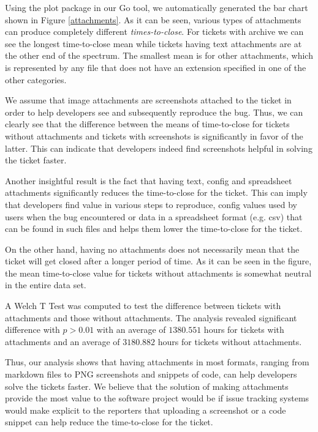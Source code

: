 \documentclass{mpaper}
\begin{document}
Using the plot package in our Go tool, we automatically generated the bar chart shown in Figure \ref{attachments}. 
As it can be seen, various types of attachments can produce completely different \emph{times-to-close}. For 
tickets with archive we can see the longest time-to-close mean while tickets having text attachments are at 
the other end of the spectrum. The smallest mean is for other attachments, which is represented by any file 
that does not have an extension specified in one of the other categories. 

We assume that image attachments are screenshots attached to the ticket in order to help developers see and 
subsequently reproduce the bug. Thus, we can clearly see that the difference between the means of time-to-close 
for tickets without attachments and tickets with screenshots is significantly in favor of the latter. This can 
indicate that developers indeed find screenshots helpful in solving the ticket faster.

Another insightful result is the fact that having text, config and spreadsheet attachments significantly 
reduces the time-to-close for the ticket. This can imply that developers find value in various steps to reproduce, 
config values used by users when the bug encountered or data in a spreadsheet format (e.g. csv) that can be 
found in such files and helps them lower the time-to-close for the ticket.

On the other hand, having no attachments does not necessarily mean that the ticket will get closed after 
a longer period of time. As it can be seen in the figure, the mean time-to-close value for tickets without 
attachments is somewhat neutral in the entire data set.

A Welch T Test was computed to test the difference between tickets with attachments and those 
without attachments. The analysis revealed significant difference with $p > 0.01$ with an
average of $1380.551$ hours for tickets with attachments and an average of $3180.882$ hours
for tickets without attachments. 

Thus, our analysis shows that having attachments in most formats, ranging from markdown files to PNG screenshots 
and snippets of code, can help developers solve the tickets faster. We believe that the solution of making attachments
provide the most value to the software project would be if issue tracking systems would make explicit to the reporters 
that uploading a screenshot or a code snippet can help reduce the time-to-close for the ticket.
\end{document}
